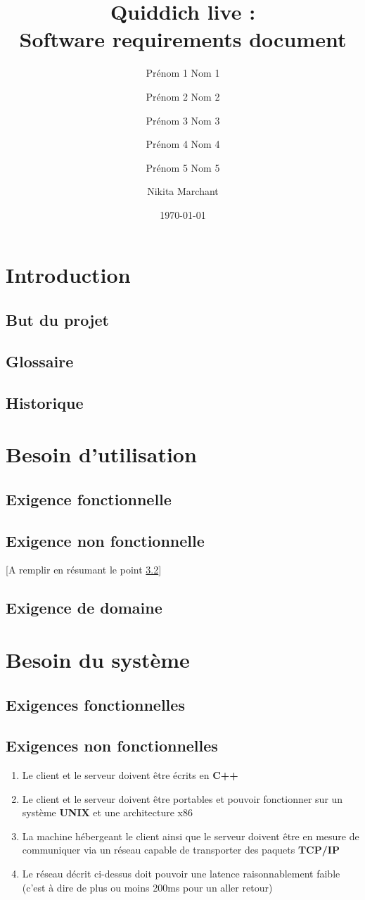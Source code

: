 \documentclass[a4paper]{article}
\title{Quiddich live : \\Software requirements document}
\author{Prénom 1 Nom 1 \and Prénom 2 Nom 2 \and Prénom 3 Nom 3 \and
Prénom 4 Nom 4 \and Prénom 5 Nom 5 \and Nikita Marchant}
\date{\today}
\begin{document}
\maketitle

\section{Introduction}
\subsection{But du projet}
\subsection{ Glossaire}
\subsection{Historique}
\section{Besoin d'utilisation}
\subsection{Exigence fonctionnelle}
\subsection{Exigence non fonctionnelle}
[A remplir en résumant le point \ref{enf}]
\subsection{Exigence de domaine}
\section{Besoin du système}
\subsection{Exigences fonctionnelles}
\subsection{Exigences non fonctionnelles}
\label{enf}

\begin{enumerate}
\item Le client et le serveur doivent être écrits en \textbf{C++}
\item Le client et le serveur doivent être portables et pouvoir fonctionner sur un système \textbf{UNIX} et une architecture x86
\item La machine hébergeant le client ainsi que le serveur doivent être en mesure de communiquer via un réseau capable de transporter des paquets \textbf{TCP/IP}
\item Le réseau décrit ci-dessus doit pouvoir une latence raisonnablement faible (c'est à dire de plus ou moins 200ms pour un aller retour)
\end{enumerate}
\end{document}
